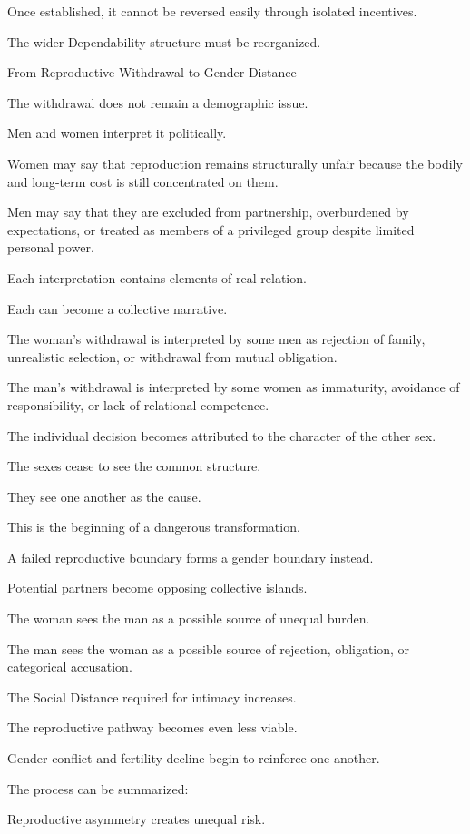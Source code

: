Once established, it cannot be reversed easily through isolated incentives.

The wider Dependability structure must be reorganized.

From Reproductive Withdrawal to Gender Distance

The withdrawal does not remain a demographic issue.

Men and women interpret it politically.

Women may say that reproduction remains structurally unfair because the bodily and long-term cost is still concentrated on them.

Men may say that they are excluded from partnership, overburdened by expectations, or treated as members of a privileged group despite limited personal power.

Each interpretation contains elements of real relation.

Each can become a collective narrative.

The woman’s withdrawal is interpreted by some men as rejection of family, unrealistic selection, or withdrawal from mutual obligation.

The man’s withdrawal is interpreted by some women as immaturity, avoidance of responsibility, or lack of relational competence.

The individual decision becomes attributed to the character of the other sex.

The sexes cease to see the common structure.

They see one another as the cause.

This is the beginning of a dangerous transformation.

A failed reproductive boundary forms a gender boundary instead.

Potential partners become opposing collective islands.

The woman sees the man as a possible source of unequal burden.

The man sees the woman as a possible source of rejection, obligation, or categorical accusation.

The Social Distance required for intimacy increases.

The reproductive pathway becomes even less viable.

Gender conflict and fertility decline begin to reinforce one another.

The process can be summarized:

Reproductive asymmetry creates unequal risk.

